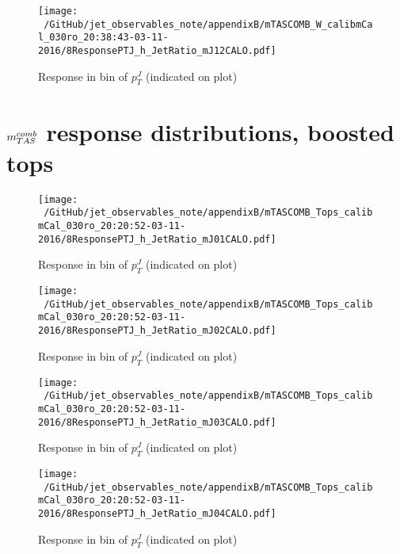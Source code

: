 \begin{figure}

\texttt{[image: ~/GitHub/jet\_observables\_note/appendixB/mTASCOMB\_W\_calibmCal\_030ro\_20:38:43-03-11-2016/8ResponsePTJ\_h\_JetRatio\_mJ12CALO.pdf]}
\caption{Response in bin of  $p_{T}^{J}$ (indicated on plot)} 

\end{figure}

\clearpage
\onecolumn
\vspace*{\fill}
\section{$m^{comb}_{TAS}$ response distributions, boosted tops}
\vfill
\clearpage
\twocolumn
 \clearpage %
\begin{figure}

\texttt{[image: ~/GitHub/jet\_observables\_note/appendixB/mTASCOMB\_Tops\_calibmCal\_030ro\_20:20:52-03-11-2016/8ResponsePTJ\_h\_JetRatio\_mJ01CALO.pdf]}
\caption{Response in bin of  $p_{T}^{J}$ (indicated on plot)} 

\end{figure}

\begin{figure}

\texttt{[image: ~/GitHub/jet\_observables\_note/appendixB/mTASCOMB\_Tops\_calibmCal\_030ro\_20:20:52-03-11-2016/8ResponsePTJ\_h\_JetRatio\_mJ02CALO.pdf]}
\caption{Response in bin of  $p_{T}^{J}$ (indicated on plot)} 

\end{figure}

\begin{figure}

\texttt{[image: ~/GitHub/jet\_observables\_note/appendixB/mTASCOMB\_Tops\_calibmCal\_030ro\_20:20:52-03-11-2016/8ResponsePTJ\_h\_JetRatio\_mJ03CALO.pdf]}
\caption{Response in bin of  $p_{T}^{J}$ (indicated on plot)} 

\end{figure}

\begin{figure}

\texttt{[image: ~/GitHub/jet\_observables\_note/appendixB/mTASCOMB\_Tops\_calibmCal\_030ro\_20:20:52-03-11-2016/8ResponsePTJ\_h\_JetRatio\_mJ04CALO.pdf]}
\caption{Response in bin of  $p_{T}^{J}$ (indicated on plot)} 

\end{figure}

